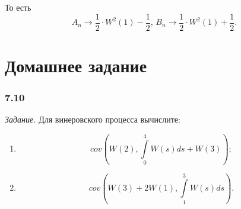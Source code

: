То есть
\begin{equation*}
  A_n \to \frac{1}{2} \cdot W^2 \left( 1 \right) - \frac{1}{2}, \,
  B_n \to \frac{1}{2} \cdot W^2 \left( 1 \right) + \frac{1}{2}.
\end{equation*}

\section*{Домашнее задание}

\subsubsection*{7.10}

\textit{Задание.}
Для винеровского процесса вычислите:
\begin{enumerate}[label=\alph*)]
  \item $$cov \left(
      W \left( 2 \right), \int \limits_0^4 W \left( s \right) ds + W \left( 3 \right) \right);$$
  \item $$cov \left(
      W \left( 3 \right) + 2 W \left( 1 \right), \int \limits_1^3 W \left( s \right) ds \right).$$
\end{enumerate}

